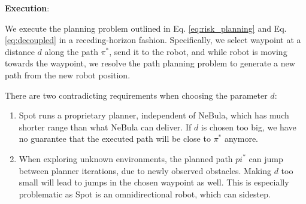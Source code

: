 \documentclass[letterpaper, 10pt, conference]{ieeeconf}      %
\newcommand{\ph}[1]{{\textbf{#1}:}} %
\newcommand{\rev}[1]{{\color{blue} #1 }} %
\begin{document}



  

\ph{Execution}
\rev{We execute the planning problem outlined in Eq. \ref{eq:risk_planning} and Eq. \ref{eq:decoupled} in a receding-horizon fashion. 
Specifically, we select waypoint at a distance $d$ along the path $\pi^*$, send it to the robot, and while robot is moving towards the waypoint, we resolve the path planning problem to generate a new path from the new robot position. 

There are two contradicting requirements when choosing the parameter $d$:
\begin{enumerate}
    \item Spot runs a proprietary planner, independent of NeBula, which has much shorter range than what NeBula can deliver. If $d$ is chosen too big, we have no guarantee that the executed path will be close to $\pi^*$ anymore.
    \item When exploring unknown environments, the planned path $pi^*$ can jump between planner iterations, due to newly observed obstacles. Making $d$ too small will lead to jumps in the chosen waypoint as well. This is especially problematic as Spot is an omnidirectional robot, which can sidestep.
\end{enumerate}}

\end{document}
